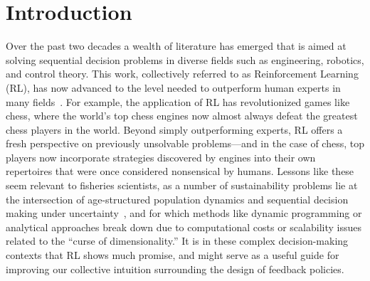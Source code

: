 \documentclass[floatfix,nofootinbib,longbibliography,notitlepage]{revtex4-2}
\begin{document}
\maketitle

\tableofcontents
\makeatletter
\let\toc@pre\relax
\let\toc@post\relax
\makeatother 

%
%
%
\section{Introduction}

Over the past two decades a wealth of literature has emerged that is aimed at solving sequential decision problems in diverse fields such as engineering, robotics, and control theory.  
This work, collectively referred to as Reinforcement Learning (RL), has now advanced to the level needed to outperform human experts in many fields~\cite{sutton-rl,bertsekas-rl}.  
For example, the application of RL has revolutionized games like chess, where the world’s top chess engines now almost always defeat the greatest chess players in the world. 
Beyond simply outperforming experts, RL offers a fresh perspective on previously unsolvable problems—and in the case of chess, top players now incorporate strategies discovered by engines into their own repertoires that were once considered nonsensical by humans. 
Lessons like these seem relevant to fisheries scientists, as a number of sustainability problems lie at the intersection of age-structured population dynamics and sequential decision making under uncertainty~\cite{walters-hilborn-1978}, and for which methods like dynamic programming or analytical approaches break down due to computational costs or scalability issues related to the “curse of dimensionality.”  
It is in these complex decision-making contexts that RL shows much promise, and might serve as a useful guide for improving our collective intuition surrounding the design of feedback policies.
\end{document}
